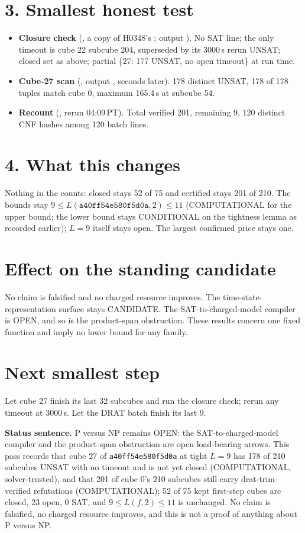 \documentclass[11pt]{article}
\begin{document}
\section*{3. Smallest honest test}
\begin{itemize}
\item \textbf{Closure check} (, a copy of H0348's ; output ). No SAT line; the only timeout is cube 22 subcube 204, superseded by its 3000\,s rerun UNSAT; closed set as above; partial \{27: 177 UNSAT, no open timeout\} at run time.
\item \textbf{Cube-27 scan} (, output , seconds later). 178 distinct UNSAT, 178 of 178 tuples match cube 0, maximum 165.4\,s at subcube 54.
\item \textbf{Recount} (, rerun 04:09\,PT). Total verified 201, remaining 9, 120 distinct CNF hashes among 120 batch lines.
\end{itemize}

\section*{4. What this changes}
Nothing in the counts: closed stays 52 of 75 and certified stays 201 of 210. The bounds stay $9\le L(\texttt{a40ff54e580f5d0a},2)\le 11$ (COMPUTATIONAL for the upper bound; the lower bound stays CONDITIONAL on the tightness lemma as recorded earlier); $L=9$ itself stays open. The largest confirmed price stays one.

\section*{Effect on the standing candidate}
No claim is falsified and no charged resource improves. The time-state-representation surface stays CANDIDATE. The SAT-to-charged-model compiler is OPEN, and so is the product-span obstruction. These results concern one fixed function and imply no lower bound for any family.

\section*{Next smallest step}
Let cube 27 finish its last 32 subcubes and run the closure check; rerun any timeout at 3000\,s. Let the DRAT batch finish its last 9.

\bigskip
\noindent\textbf{Status sentence.} P versus NP remains OPEN: the SAT-to-charged-model compiler and the product-span obstruction are open load-bearing arrows. This pass records that cube 27 of \texttt{a40ff54e580f5d0a} at tight $L=9$ has 178 of 210 subcubes UNSAT with no timeout and is not yet closed (COMPUTATIONAL, solver-trusted), and that 201 of cube 0's 210 subcubes still carry drat-trim-verified refutations (COMPUTATIONAL); 52 of 75 kept first-step cubes are closed, 23 open, 0 SAT, and $9\le L(f,2)\le 11$ is unchanged. No claim is falsified, no charged resource improves, and this is not a proof of anything about P versus NP.
\end{document}
